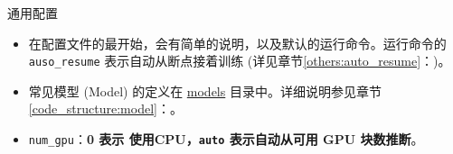 \documentclass[../main.tex]{subfiles}
\begin{document}
\begin{exampleBox}[righthand ratio=0.00, sidebyside, sidebyside align=center, lower separated=false]{通用配置}
\begin{itemize}
    \item 在配置文件的最开始，会有简单的说明，以及默认的运行命令。运行命令的 \texttt{auso\_resume} 表示自动从断点接着训练 (详见章节\ref{others:auto_resume}：)。
    \item 常见模型 (Model) 的定义在 \href{https://github.com/XPixelGroup/BasicSR/tree/master/basicsr/models}{models} 目录中。详细说明参见章节\ref{code_structure:model}：。
    \item \texttt{num\_gpu}：\textbf{0 表示 使用CPU，\texttt{auto} 表示自动从可用 GPU 块数推断}。
\end{itemize}
\end{exampleBox}
\end{document}
